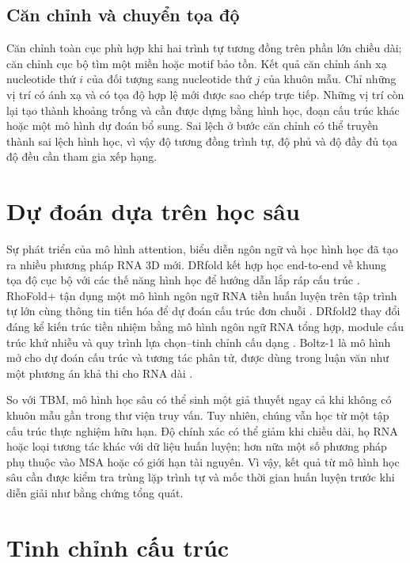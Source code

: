 \documentclass[12pt,a4paper,oneside]{report}
\begin{document}
\subsection{Căn chỉnh và chuyển tọa độ}

Căn chỉnh toàn cục phù hợp khi hai trình tự tương đồng trên phần lớn chiều dài; căn chỉnh
cục bộ tìm một miền hoặc motif bảo tồn. Kết quả căn chỉnh ánh xạ nucleotide thứ $i$ của
đối tượng sang nucleotide thứ $j$ của khuôn mẫu. Chỉ những vị trí có ánh xạ và có tọa
độ hợp lệ mới được sao chép trực tiếp. Những vị trí còn lại tạo thành khoảng trống và
cần được dựng bằng hình học, đoạn cấu trúc khác hoặc một mô hình dự đoán bổ sung. Sai lệch
ở bước căn chỉnh có thể truyền thành sai lệch hình học, vì vậy độ tương đồng trình tự,
độ phủ và độ đầy đủ tọa độ đều cần tham gia xếp hạng.

\section{Dự đoán dựa trên học sâu}

Sự phát triển của mô hình attention, biểu diễn ngôn ngữ và học hình học đã tạo ra nhiều
phương pháp RNA 3D mới. DRfold kết hợp học end-to-end về khung tọa độ cục bộ với các thế
năng hình học để hướng dẫn lắp ráp cấu trúc \cite{drfold}. RhoFold+ tận dụng một mô hình
ngôn ngữ RNA tiền huấn luyện trên tập trình tự lớn cùng thông tin tiến hóa để dự đoán
cấu trúc đơn chuỗi \cite{rhofoldplus}. DRfold2 thay đổi đáng kể kiến trúc tiền nhiệm bằng
mô hình ngôn ngữ RNA tổng hợp, module cấu trúc khử nhiễu và quy trình lựa chọn--tinh
chỉnh cấu dạng \cite{drfold2}. Boltz-1 là mô hình mở cho dự đoán cấu trúc và tương tác
phân tử, được dùng trong luận văn như một phương án khả thi cho RNA dài
\cite{boltz1}.

So với TBM, mô hình học sâu có thể sinh một giả thuyết ngay cả khi không có khuôn mẫu
gần trong thư viện truy vấn. Tuy nhiên, chúng vẫn học từ một tập cấu trúc thực nghiệm
hữu hạn. Độ chính xác có thể giảm khi chiều dài, họ RNA hoặc loại tương tác khác với
dữ liệu huấn luyện; hơn nữa một số phương pháp phụ thuộc vào MSA hoặc có giới hạn tài
nguyên. Vì vậy, kết quả từ mô hình học sâu cần được kiểm tra trùng lặp trình tự và mốc
thời gian huấn luyện trước khi diễn giải như bằng chứng tổng quát.

\section{Tinh chỉnh cấu trúc}
\end{document}
